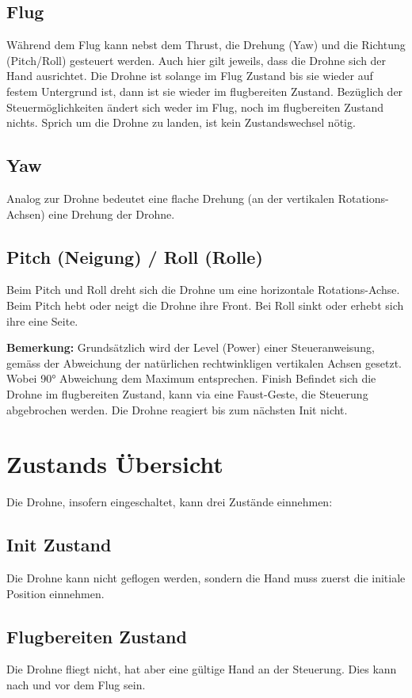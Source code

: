 \subsection{Flug}
Während dem Flug kann nebst dem Thrust, die Drehung (Yaw) und die Richtung (Pitch/Roll) gesteuert werden. Auch hier gilt jeweils, dass die Drohne sich der Hand ausrichtet. Die Drohne ist solange im Flug Zustand bis sie wieder auf festem Untergrund ist, dann ist sie wieder im flugbereiten Zustand. Bezüglich der Steuermöglichkeiten ändert sich weder im Flug, noch im flugbereiten Zustand nichts. Sprich um die Drohne zu landen, ist kein Zustandswechsel nötig.

\subsection{Yaw}
Analog zur Drohne bedeutet eine flache Drehung (an der vertikalen Rotations-Achsen) eine Drehung der Drohne.

\subsection{Pitch (Neigung) / Roll (Rolle)}
Beim Pitch und Roll dreht sich die Drohne um eine horizontale Rotations-Achse. Beim Pitch hebt oder neigt die Drohne ihre Front. Bei Roll sinkt oder erhebt sich ihre eine Seite.


\textbf{Bemerkung:} Grundsätzlich wird der Level (Power) einer Steueranweisung, gemäss der Abweichung der natürlichen rechtwinkligen vertikalen Achsen gesetzt. Wobei 90° Abweichung dem Maximum entsprechen.
Finish
Befindet sich die Drohne im flugbereiten Zustand, kann via eine Faust-Geste, die Steuerung abgebrochen werden. Die Drohne reagiert bis zum nächsten Init nicht.

\section{Zustands Übersicht}
Die Drohne, insofern eingeschaltet, kann drei Zustände einnehmen:

\subsection{Init Zustand}
Die Drohne kann nicht geflogen werden, sondern die Hand muss zuerst die initiale Position einnehmen.

\subsection{Flugbereiten Zustand}
Die Drohne fliegt nicht, hat aber eine gültige Hand an der Steuerung. Dies kann nach und vor dem Flug sein.

